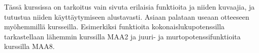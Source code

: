 Tässä kurssissa on tarkoitus vain sivuta erilaisia funktioita ja niiden kuvaajia, ja tutustua niiden käyttäytymiseen alustavasti. 
Asiaan palataan useaan otteeseen myöhemmillä kursseilla. Esimerkiksi funktioita kokonaislukupotenssilla tarkastellaan lähemmin kurssilla MAA2 ja
juuri- ja murtopotenssifunktioita kurssilla MAA8.





